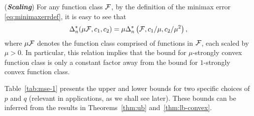 \begin{remark}(\textbf{\textit{Scaling}})
For any function class $\mathcal{F}$, by the definition of the minimax error \eqref{eq:minimaxerrdef}, it is easy to see that
$$\Delta_n^*(\mu \mathcal{F}, c_1,c_2) = \mu \Delta_n^*\left(\mathcal{F}, c_1/\mu,c_2/\mu^2\right),$$
 where $\mu \mathcal{F}$ denotes the function class comprised of functions in $\mathcal{F}$, each scaled by $\mu>0$. In particular, this relation implies that the bound for $\mu$-strongly convex function class is only a constant factor away from the bound for $1$-strongly convex function class.
\end{remark}

Table~\ref{tab:mse-1} presents the upper and lower bounds for two specific choices of $p$ and $q$ (relevant in applications, as we shall see later). These bounds can be inferred from the results in Theorems~\ref{thm:ub} and~\ref{thm:lb-convex}.

